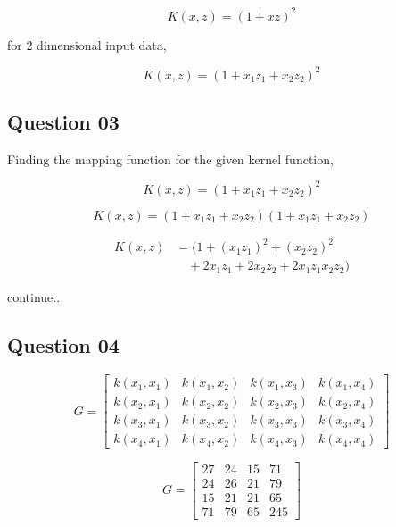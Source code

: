 \documentclass[11pt,a4paper]{article}
\begin{document}
\begin{equation}
    K(x,z) =  (1 + xz)^2   
\end{equation}

for 2 dimensional input data,

\begin{equation}
    K(x,z) =  (1 + x_1z_1 + x_2z_2)^2   
\end{equation}

\subsection{Question 03}

Finding the mapping function for the given kernel function,

\begin{equation}
    K(x,z) =  (1 + x_1z_1 + x_2z_2)^2 
\end{equation}

\begin{equation}
    K(x,z) =  (1 + x_1z_1 + x_2z_2)(1 + x_1z_1 + x_2z_2)
\end{equation}

\begin{align}
    K(x,z) &=  (1 + (x_1z_1)^2 + (x_2z_2)^2 \nonumber \\
    &\quad + 2x_1z_1 + 2x_2z_2 + 2x_1z_1x_2z_2)
\end{align}

continue..


\subsection{Question 04}


\begin{equation}
    G = 
    \begin{bmatrix}
        k(x_1,x_1) & k(x_1,x_2) & k(x_1,x_3) & k(x_1,x_4) \\
        k(x_2,x_1) & k(x_2,x_2) & k(x_2,x_3) & k(x_2,x_4) \\
        k(x_3,x_1) & k(x_3,x_2) & k(x_3,x_3) & k(x_3,x_4) \\
        k(x_4,x_1) & k(x_4,x_2) & k(x_4,x_3) & k(x_4,x_4) 
    \end{bmatrix}
\end{equation}

\begin{equation}
    G = 
    \begin{bmatrix}
        27 & 24 & 15 & 71 \\
        24 & 26 & 21 & 79 \\
        15 & 21 & 21 & 65 \\
        71 & 79 & 65 & 245
    \end{bmatrix}
\end{equation}
\end{document}
